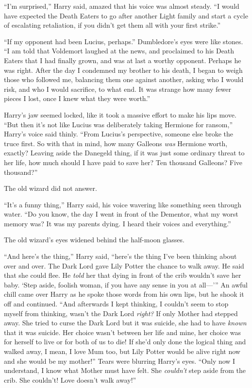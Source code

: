 “I’m surprised,” Harry said, amazed that his voice was almost steady. “I would have expected the Death Eaters to go after another Light family and start a cycle of escalating retaliation, if you didn’t get them all with your first strike.”

“If my opponent had been Lucius, perhaps.” Dumbledore’s eyes were like stones. “I am told that Voldemort laughed at the news, and proclaimed to his Death Eaters that I had finally grown, and was at last a worthy opponent. Perhaps he was right. After the day I condemned my brother to his death, I began to weigh those who followed me, balancing them one against another, asking who I would risk, and who I would sacrifice, to what end. It was strange how many fewer pieces I lost, once I knew what they were worth.”

Harry’s jaw seemed locked, like it took a massive effort to make his lips move. “But then it’s not like Lucius was deliberately taking Hermione for ransom,” Harry’s voice said thinly. “From Lucius’s perspective, someone else broke the truce first. So with that in mind, how many Galleons \emph{was} Hermione worth, exactly? Leaving aside the Danegeld thing, if it was just some ordinary threat to her life, how much should I have paid to save her? Ten thousand Galleons? Five thousand?”

The old wizard did not answer.

“It’s a funny thing,” Harry said, his voice wavering like something seen through water. “Do you know, the day I went in front of the Dementor, what my worst memory was? It was my parents dying. I heard their voices and everything.”

The old wizard’s eyes widened behind the half-moon glasses.

“And here’s the thing,” Harry said, “here’s the thing I’ve been thinking about over and over. The Dark Lord gave Lily Potter the chance to walk away. He said that she could flee. He \emph{told} her that dying in front of the crib wouldn’t save her baby. ‘Step aside, foolish woman, if you have any sense in you at all—’{}” An awful chill came over Harry as he spoke those words from his own lips, but he shook it off and continued. “And afterwards I kept thinking, I couldn’t seem to stop myself from thinking, wasn’t the Dark Lord \emph{right?} If only Mother had stepped away. She tried to curse the Dark Lord but it was suicide, she had to have \emph{known} that it was suicide. Her choice wasn’t between her life and mine, her choice was for herself to live or for both of us to die! If she’d only done the logical thing and walked away, I mean, I love Mum too, but Lily Potter would be alive right now and she would be my mother!” Tears were blurring Harry’s eyes. “Only now I understand, I know what Mother must have felt. She \emph{couldn’t} step aside from the crib. She couldn’t! Love doesn’t walk away!”

